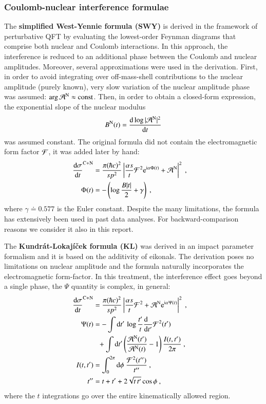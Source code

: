 \subsubsection{Coulomb-nuclear interference formulae}

The {\bf simplified West-Yennie formula (SWY)} \cite{wy68} is derived in the framework of perturbative QFT by evaluating the lowest-order Feynman diagrams that comprise both nuclear and Coulomb interactions. In this approach, the interference is reduced to an additional phase between the Coulomb and nuclear amplitudes. Moreover, several approximations were used in the derivation. First, in order to avoid integrating over off-mass-shell contributions to the nuclear amplitude (purely known), very slow variation of the nuclear amplitude phase was assumed: $\arg {\cal A}^{\rm N} \approx \hbox{const}$. Then, in order to obtain a closed-form expression, the exponential slope of the nuclear modulus
\begin{equation}
B^{\rm N}(t) = {\d \log |{\cal A}^{\rm N}|^2 \over \d t}
\end{equation}
was assumed constant. The original formula did not contain the electromagnetic form factor ${\cal F}$, it was added later by hand:
\begin{equation}
\label{eq:int swy}
	\begin{aligned}
		{\d\sigma\over \d t}^{\rm C+N} &= {\pi (\hbar c)^2 \over s p^2} \left | {\alpha s\over t} {\cal F}^2 \e^{\I\alpha \Phi(t)} + {\cal A}^{\rm N} \right |^2\ ,\cr
		\Phi(t) &= - \left( \log {B |t|\over 2} + \gamma \right)\ ,\cr
	\end{aligned}
\end{equation}
where $\gamma \doteq 0.577$ is the Euler constant. Despite the many limitations, the formula has extensively been used in past data analyses. For backward-comparison reasons we consider it also in this report.

The {\bf Kundr\' at-Lokaj\' i\v cek formula (KL)} \cite{kl94} was derived in an impact parameter formalism and it is based on the additivity of eikonals. The derivation poses no limitations on nuclear amplitude and the formula naturally incorporates the electromagnetic form-factor. In this treatment, the interference effect goes beyond a single phase, the $\Psi$ quantity is complex, in general:
\begin{equation}
\label{eq:int kl}
	\begin{aligned}
		{\d\sigma\over \d t}^{\rm C+N} &= {\pi (\hbar c)^2 \over s p^2} \left | {\alpha s\over t} {\cal F}^2 + {\cal A}^{\rm N} \e^{\I\alpha \Psi(t)} \right |^2\ ,\cr
		\Psi(t) &= 
			- \int \d t'\, \log {t'\over t} {\d\phantom{t'}\over \d t'} {\cal F}^2(t') \cr
		&\phantom{=} + \int \d t' \left( {{\cal A}^{\rm N}(t') \over {\cal A}^{\rm N}(t)} - 1 \right) { I(t, t')\over 2\pi }
			\ ,\cr
		I(t, t') &= \int_0^{2\pi} \d\phi\ {{\cal F}^2(t'')\over t''}\ , \cr
		t'' &= t + t' + 2\sqrt{t\, t'} \cos\phi\ ,\cr
	\end{aligned}
\end{equation}
where the $t$ integrations go over the entire kinematically allowed region.

